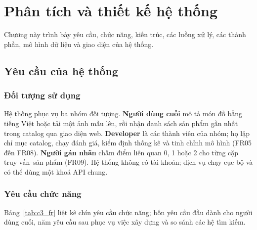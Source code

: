 \chapter{Phân tích và thiết kế hệ thống}
\label{chap:thiet_ke}

Chương này trình bày yêu cầu, chức năng, kiến trúc, các luồng xử lý, các thành phần, mô hình dữ liệu và giao diện của hệ thống.

\section{Yêu cầu của hệ thống}
\label{sec:yeu-cau}

\subsection{Đối tượng sử dụng}

Hệ thống phục vụ ba nhóm đối tượng. \textbf{Người dùng cuối} mô tả món đồ bằng tiếng Việt hoặc tải một ảnh mẫu lên, rồi nhận danh sách sản phẩm gần nhất trong catalog qua giao diện web. \textbf{Developer} là các thành viên của nhóm; họ lập chỉ mục catalog, chạy đánh giá, kiểm định thống kê và tinh chỉnh mô hình (FR05 đến FR08). \textbf{Người gán nhãn} chấm điểm liên quan 0, 1 hoặc 2 cho từng cặp truy vấn--sản phẩm (FR09). Hệ thống không có tài khoản; dịch vụ chạy cục bộ và có thể dùng một khoá API chung.

\subsection{Yêu cầu chức năng}

Bảng~\ref{tab:c3_fr} liệt kê chín yêu cầu chức năng; bốn yêu cầu đầu dành cho người dùng cuối, năm yêu cầu sau phục vụ việc xây dựng và so sánh các hệ tìm kiếm.

